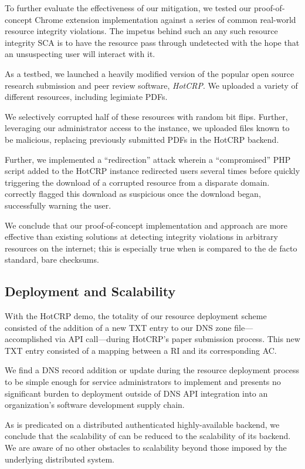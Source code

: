 To further evaluate the effectiveness of our mitigation, we tested our
proof-of-concept \SYSTEM{} Chrome extension implementation against a series of
common real-world resource integrity violations. The impetus behind such an any
such resource integrity SCA is to have the resource pass through undetected with
the hope that an unsuspecting user will interact with it.

As a testbed, we launched a heavily modified version of the popular open source
research submission and peer review software, \emph{HotCRP}. We uploaded a
variety of different resources, including legimiate PDFs.

We selectively corrupted half of these resources with random bit flips. Further,
leveraging our administrator access to the instance, we uploaded files known to
be malicious, replacing previously submitted PDFs in the HotCRP backend.

Further, we implemented a ``redirection'' attack wherein a ``compromised'' PHP
script added to the HotCRP instance redirected users several times before
quickly triggering the download of a corrupted resource from a disparate domain.
\SYSTEM{} correctly flagged this download as suspicious once the download began,
successfully warning the user.

We conclude that our proof-of-concept \SYSTEM{} implementation and approach are
more effective than existing solutions at detecting integrity violations in
arbitrary resources on the internet; this is especially true when \SYSTEM{} is
compared to the de facto standard, bare checksums.

\subsection{Deployment and Scalability}

With the HotCRP demo, the totality of our resource deployment scheme consisted
of the addition of a new TXT entry to our DNS zone file---accomplished via API
call---during HotCRP's paper submission process. This new TXT entry consisted of
a mapping between a RI and its corresponding AC.

We find a DNS record addition or update during the resource deployment process
to be simple enough for service administrators to implement and presents no
significant burden to deployment outside of DNS API integration into an
organization's software development supply chain.

As \SYSTEM{} is predicated on a distributed authenticated highly-available
backend, we conclude that the scalability of \SYSTEM{} can be reduced to the
scalability of its backend. We are aware of no other obstacles to scalability
beyond those imposed by the underlying distributed system.

